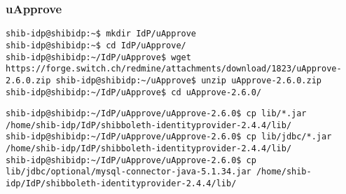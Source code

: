 \subsubsection{uApprove}
\begin{lstlisting}
shib-idp@shibidp:~$ mkdir IdP/uApprove
shib-idp@shibidp:~$ cd IdP/uApprove/
shib-idp@shibidp:~/IdP/uApprove$ wget
https://forge.switch.ch/redmine/attachments/download/1823/uApprove-2.6.0.zip shib-idp@shibidp:~/uApprove$ unzip uApprove-2.6.0.zip
shib-idp@shibidp:~/IdP/uApprove$ cd uApprove-2.6.0/
\end{lstlisting}
\begin{lstlisting}
shib-idp@shibidp:~/IdP/uApprove/uApprove-2.6.0$ cp lib/*.jar /home/shib-idp/IdP/shibboleth-identityprovider-2.4.4/lib/
shib-idp@shibidp:~/IdP/uApprove/uApprove-2.6.0$ cp lib/jdbc/*.jar /home/shib-idp/IdP/shibboleth-identityprovider-2.4.4/lib/
shib-idp@shibidp:~/IdP/uApprove/uApprove-2.6.0$ cp lib/jdbc/optional/mysql-connector-java-5.1.34.jar /home/shib-idp/IdP/shibboleth-identityprovider-2.4.4/lib/
\end{lstlisting}
